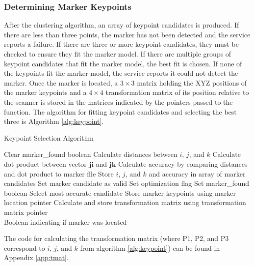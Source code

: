 \subsubsection{Determining Marker Keypoints}
After the clustering algorithm, an array of keypoint candidates is produced. If there are less than three points, the marker has not been detected and the service reports a failure. If there are three or more keypoint candidates, they must be checked to ensure they fit the marker model. If there are multiple groups of keypoint candidates that fit the marker model, the best fit is chosen. If none of the keypoints fit the marker model, the service reports it could not detect the marker. Once the marker is located, a $3\times3$ matrix holding the XYZ positions of the marker keypoints and a $4\times4$ transformation matrix of its position relative to the scanner is stored in the matrices indicated by the pointers passed to the function. The algorithm for fitting keypoint candidates and selecting the best three is Algorithm \ref{alg:keypoint}.
\begin{spacing}{0.8}
\begin{algorithm}[H]
\caption{Keypoint Selection Algorithm}
\label{alg:keypoint}
\begin{algorithmic}[1]
\begin{raggedright}
\State Clear marker\_found boolean
\State Calculate distances between $i$, $j$, and $k$
\State Calculate dot product between vector $\mathbf{ji}$ and $\mathbf{jk}$
\State Calculate accuracy by comparing distances and dot product to marker file
\State Store $i$, $j$, and $k$ and accuracy in array of marker candidates
\State Set marker candidate as valid
\State Set optimization flag
\EndIf
\EndIf
\EndIf
\EndFor
\EndFor
\EndFor
{}
\State Set marker\_found boolean
\State Select most accurate candidate
\EndIf
\State Store marker keypoints using marker location pointer 
\State Calculate and store transformation matrix using transformation matrix pointer \
\EndIf
\EndFunction\\
\Return Boolean indicating if marker was located
\end{raggedright}
\end{algorithmic}
\end{algorithm}
\end{spacing}
The code for calculating the transformation matrix (where P1, P2, and P3 correspond to $i$, $j$, and $k$ from algorithm \ref{alg:keypoint}) can be found in Appendix \ref{app:tmat}.\\

